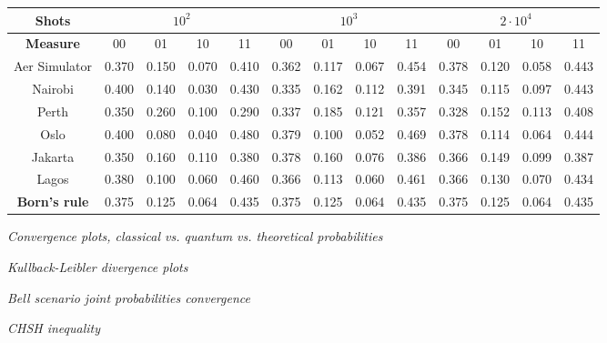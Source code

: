 \begin{landscape}
\vspace*{\fill}
\begin{tabular}{c|cccc|cccc|cccc}
\toprule
\textbf{Shots}  & \multicolumn{4}{c|}{$10^2$} 
                & \multicolumn{4}{c|}{$10^3$} 
                & \multicolumn{4}{c}{$2\cdot 10^4$}\\
\midrule
\textbf{Measure}  & 00 & 01 & 10 & 11
    & 00 & 01 & 10 & 11
    & 00 & 01 & 10 & 11\\
\midrule
Aer Simulator   & 0.370 & 0.150 & 0.070 & 0.410 
                & 0.362 & 0.117 & 0.067 & 0.454 
                & 0.378 & 0.120 & 0.058 & 0.443\\                
Nairobi         & 0.400 & 0.140 & 0.030 & 0.430 
                & 0.335 & 0.162 & 0.112 & 0.391 
                & 0.345 & 0.115 & 0.097 & 0.443\\               
Perth           & 0.350 & 0.260 & 0.100 & 0.290 
                & 0.337 & 0.185 & 0.121 & 0.357 
                & 0.328 & 0.152 & 0.113 & 0.408\\
Oslo            & 0.400 & 0.080 & 0.040 & 0.480 
                & 0.379 & 0.100 & 0.052 & 0.469 
                & 0.378 & 0.114 & 0.064 & 0.444\\
Jakarta         & 0.350 & 0.160 & 0.110 & 0.380 
                & 0.378 & 0.160 & 0.076 & 0.386 
                & 0.366 & 0.149 & 0.099 & 0.387\\   
Lagos           & 0.380 & 0.100 & 0.060 & 0.460 
                & 0.366 & 0.113 & 0.060 & 0.461 
                & 0.366 & 0.130 & 0.070 & 0.434\\
\midrule
\textbf{Born's rule}     & 0.375 & 0.125 & 0.064 & 0.435 
                & 0.375 & 0.125 & 0.064 & 0.435
                & 0.375 & 0.125 & 0.064 & 0.435\\
\bottomrule        
\end{tabular}
\label{table:quantum_results}
\vspace*{\fill}
\end{landscape}

\textit{Convergence plots, classical vs. quantum vs. theoretical probabilities}

\textit{Kullback-Leibler divergence plots}

\textit{Bell scenario joint probabilities convergence}

\textit{CHSH inequality}
